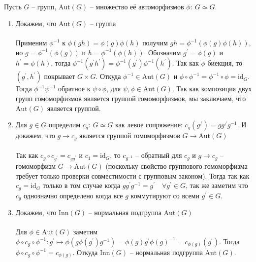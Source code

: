 		\subsection{}
		Пусть $G$ -- групп, $\text{Aut}(G)$ -- множество её автоморфизмов $\phi:\ G \simeq G$.
		\begin{enumerate}
			\item Докажем, что $\text{Aut}(G)$ -- группа\\
				\\
				Применим $\phi^{-1}$ к $\phi(gh) = \phi(g) \phi(h)$ получим $gh = \phi^{-1} (\phi(g) \phi(h))$, но $g = \phi^{-1} (\phi(g))$ и $h = \phi^{-1} (\phi(h))$. Обозначим $g^{\prime} = \phi(g)$ и $h^{\prime} = \phi(h)$, тогда $\phi^{-1} (g^{\prime} h^{\prime})=\phi^{-1}(g^{\prime}) \phi^{-1}(h^{\prime})$. Так как $\phi$ биекция, то $(g^{\prime}, h^{\prime})$ покрывает $G \times G$. Откуда $\phi^{-1} \in \text{Aut}(G)$ и $\phi \circ \phi^{-1} = \phi^{-1} \circ \phi = \text{id}_G$. Тогда $\phi^{-1} \psi^{-1}$ обратное к $\psi \circ \phi$, для $\psi, \phi \in \text{Aut}(G)$. Так как композиция двух групп гомоморфизмов является группой
				гомоморфизмов, мы заключаем, что $\text{Aut}(G)$ является группой.
				
			\item Для $g \in G$ определим $c_g:\ G \simeq G$ как левое сопряжение: $c_g(g^{\slash}) = g g^{\slash} g^{-1}$. И докажем, что $g \to c_g$ является группой гомоморфизмов $G \to \text{Aut}(G)$\\
				\\
				Так как $c_{g} \circ c_{g^{\prime}} = c_{g g^{\prime}}$ и $c_1 = \text{id}_G$, то $c_{g^{-1}}$ -- обратный для $c_g$ и $g \to c_g$ -- гомоморфизм $G \to \text{Aut}(G)$ (поскольку свойство группового гомоморфизма требует только проверки совместимости с групповым законом). Тогда так как $c_g = \text{id}_G$ только в том случае когда $g g^{\prime} g^{-1} = g^{\prime}\quad \forall g^{\prime} \in G$, так же заметим что $c_g$ однозначно определено когда все $g$ коммутируют со всеми $g^{\prime} \in G$.					
			
			\item Докажем, что $\text{Inn}(G)$ -- нормальная подгруппа $\text{Aut}(G)$\\
				\\
				Для $\phi \in \text{Aut}(G)$ заметим $\phi \circ c_{g} \circ \phi^{-1}: g^{\prime} \mapsto \phi(g \phi(g^{\prime}) g^{-1})=\phi(g) g^{\prime} \phi(g)^{-1}=c_{\phi(g)}(g^{\prime})$. Тогда $\phi \circ c_g \circ \phi^{-1} = c_{\phi(g)}$. Откуда $\text{Inn}(G)$ -- нормальная подгруппа $\text{Aut}(G)$.
		\end{enumerate}
		
